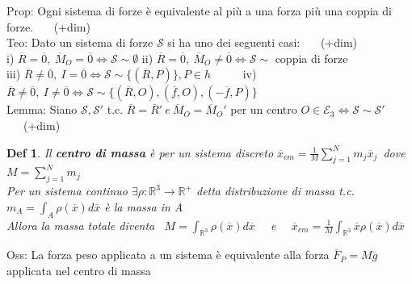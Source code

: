 \documentclass{article}
\theoremstyle{unnumbered}
\newtheorem* {theoremT}{Def}
\theoremstyle{unnumbered1}
\newenvironment{defi}{\begin{gBox}\begin{theoremT}}{\end{theoremT}\end{gBox}}
\begin{document}
%
%
%
Prop: Ogni sistema di forze è equivalente al più a una forza più una coppia di forze. \ \ \ (+dim)\\
%
Teo: Dato un sistema di forze $\mathcal{S}$ si ha uno dei seguenti casi: \ \ \ (+dim)\\
\phantom{\ \ \ \ \ \ } i) $\overline{R}=\overline{0}, \ \overline{M}_O=\overline{0} \Leftrightarrow \mathcal{S}\sim\emptyset$ \hspace{0.77in}
ii) $\overline{R}=\overline{0}, \ \overline{M}_O\neq\overline{0} \Leftrightarrow \mathcal{S}\sim$ coppia di forze \\
\phantom{\ \ \ \ \ \ } iii) $\overline{R}\neq\overline{0}, \ I=\overline{0} \Leftrightarrow \mathcal{S}\sim\{(\overline{R},P)\}, P\in h$ \ \ \ \ \
iv) $\overline{R}\neq\overline{0}, \ I\neq\overline{0} \Leftrightarrow \mathcal{S}\sim\{(\overline{R},O),(\overline{f},O),(-\overline{f},P)\}$ \\
%
Lemma: Siano $\mathcal{S}, \mathcal{S}'$ t.c. $\overline{R}=\overline{R}' \ e \ \overline{M}_O=\overline{M}_O'$ per un centro $O \in \mathcal{E}_3 \Leftrightarrow \mathcal{S} \sim \mathcal{S}'$ \ \ \ (+dim)\\
%
%
%
\begin{defi}
Il \textbf{centro di massa} è per un sistema discreto $\overline{x}_{cm}=\frac{1}M \sum_{j=1}^Nm_j\overline{x}_j$\ dove $M=\sum_{j=1}^Nm_j$\\
%
Per un sistema continuo $\exists \rho :\mathbb{R}^3\rightarrow\mathbb{R}^+$ detta distribuzione di massa t.c. \ $m_A=\int_A\rho(\overline{x})d\overline{x}$ è la massa in A\\
\phantom{\ \ \ \ } Allora la massa totale diventa \  $M=\int_{\mathbb{R}^3}\rho(\overline{x})d\overline{x}$ \ \ e \ \ $\overline{x}_{cm}=\frac{1}M \int_{\mathbb{R}^3} \overline{x}\rho(\overline{x})d\overline{x}$
\end{defi}
%
%
Oss: La forza peso applicata a un sistema è equivalente alla forza $\overline{F}_P=M\overline{g}$ applicata nel centro di massa
%
%
\end{document}
